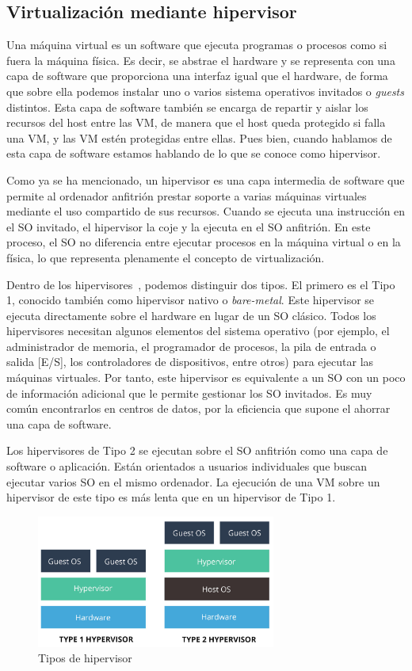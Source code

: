 \subsection{Virtualización mediante hipervisor} \label{sec:hiperv}
	Una máquina virtual es un software que ejecuta programas o procesos como si fuera la máquina física. Es decir, se abstrae el hardware y se representa con una capa de software que proporciona una interfaz igual que el hardware, de forma que sobre ella podemos instalar uno o varios sistema operativos invitados o \textit{guests} distintos. Esta capa de software también se encarga de repartir y aislar los recursos del host entre las VM, de manera que el host queda protegido si falla una VM, y las VM estén protegidas entre ellas. Pues bien, cuando hablamos de esta capa de software estamos hablando de lo que se conoce como hipervisor. 

	Como ya se ha mencionado, un hipervisor es una capa intermedia de software que permite al ordenador anfitrión prestar soporte a varias máquinas virtuales mediante el uso compartido de sus recursos. Cuando se ejecuta una instrucción en el SO invitado, el hipervisor la coje y la ejecuta en el SO anfitrión. En este proceso, el SO no diferencia entre ejecutar procesos en la máquina virtual o en la física, lo que representa plenamente el concepto de virtualización.

	Dentro de los hipervisores~\cite{virt3}, podemos distinguir dos tipos. El primero es el Tipo 1, conocido también como hipervisor nativo o \textit{bare-metal}. Este hipervisor se ejecuta directamente sobre el hardware en lugar de un SO clásico. Todos los hipervisores necesitan algunos elementos del sistema operativo (por ejemplo, el administrador de memoria, el programador de procesos, la pila de entrada o salida [E/S], los controladores de dispositivos, entre otros) para ejecutar las máquinas virtuales. Por tanto, este hipervisor es equivalente a un SO con un poco de información adicional que le permite gestionar los SO invitados. Es muy común encontrarlos en centros de datos, por la eficiencia que supone el ahorrar una capa de software.

	Los hipervisores de Tipo 2 se ejecutan sobre el SO anfitrión como una capa de software o aplicación. Están orientados a usuarios individuales que buscan ejecutar varios SO en el mismo ordenador. La ejecución de una VM sobre un hipervisor de este tipo es más lenta que en un hipervisor de Tipo 1.

	\begin{figure}[h]
	\centering
	\includegraphics[width=0.7\textwidth]{../imgs/EdA/hipervisor.jpg}
	\caption{Tipos de hipervisor}
	\label{fig:hipervtypes}
	\end{figure}


